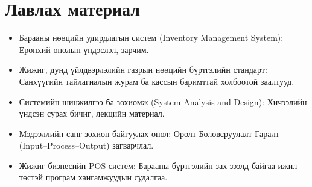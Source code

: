 \section{Лавлах материал}
\begin{itemize}
    \item Барааны нөөцийн удирдлагын систем (Inventory Management System): Ерөнхий онолын үндэслэл, зарчим.
    \item Жижиг, дунд үйлдвэрлэлийн газрын нөөцийн бүртгэлийн стандарт: Санхүүгийн тайлагналын журам ба кассын баримттай холбоотой заалтууд.
    \item Системийн шинжилгээ ба зохиомж (System Analysis and Design): Хичээлийн үндсэн сурах бичиг, лекцийн материал.
    \item Мэдээллийн санг зохион байгуулах онол: Оролт-Боловсруулалт-Гаралт (Input--Process--Output) загварчлал.
    \item Жижиг бизнесийн POS систем: Барааны бүртгэлийн зах зээлд байгаа ижил төстэй програм хангамжуудын судалгаа.
\end{itemize}


